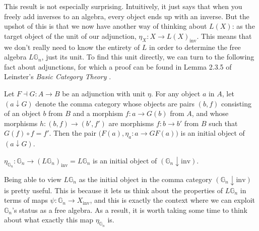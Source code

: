 This result is not especially surprising. Intuitively, it just says that when you freely add inverses to an algebra, every object ends up with an inverse. But the upshot of this is that we now have another way of thinking about $L(X)$: as the target object of the unit of our adjunction, $\eta_X: X \to L(X)_{\mathrm{inv}}$. This means that we don't really need to know the entirety of $L$ in order to determine the free algebra $L\mathbb{G}_n$, just its unit. To find this unit directly, we can turn to the following fact about adjunctions, for which a proof can be found in Lemma 2.3.5 of Leinster's \textit{Basic Category Theory} \cite{bct}.

\begin{prop}\label{initial} Let $F \dashv G: A \to B$ be an adjunction with unit $\eta$. For any object $a$ in $A$, let $(a \downarrow G)$ denote the comma category whose objects are pairs $(b, f)$ consisting of an object $b$ from $B$ and a morphism $f: a \to G(b)$ from $A$, and whose morphisms $h: (b, f) \to (b', f')$ are morphisms $f: b \to b'$ from $B$ such that $G(f) \circ f = f'$. Then the pair $\big(F(a), \eta_a: a \to GF(a) \big)$ is an initial object of $(a \downarrow G)$.
\end{prop}

\begin{cor} $\eta_{\mathbb{G}_n}: \mathbb{G}_n \to (L\mathbb{G}_n)_{\mathrm{inv}} = L\mathbb{G}_n$ is an initial object of $(\mathbb{G}_n \downarrow \mathrm{inv})$.
\end{cor}

Being able to view $L\mathbb{G}_n$ as the initial object in the comma category $(\mathbb{G}_n \downarrow \mathrm{inv})$ is pretty useful. This is because it lets us think about the properties of $L\mathbb{G}_n$ in terms of maps $\psi: \mathbb{G}_n \to X_{\mathrm{inv}}$, and this is exactly the context where we can exploit $\mathbb{G}_n$'s status as a free algebra. As a result, it is worth taking some time to think about what exactly this map $\eta_{\mathbb{G}_n}$ is.

